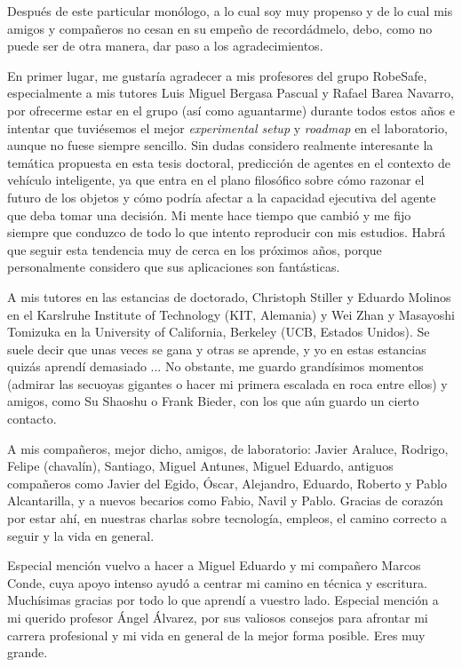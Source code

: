 Después de este particular monólogo, a lo cual soy muy propenso y de lo cual mis amigos y compañeros no cesan en su empeño de recordádmelo, debo, como no puede ser de otra manera, dar paso a los agradecimientos.

En primer lugar, me gustaría agradecer a mis profesores del grupo RobeSafe, especialmente a mis tutores Luis Miguel Bergasa Pascual y Rafael Barea Navarro, por ofrecerme estar en el grupo (así como aguantarme) durante todos estos años e intentar que tuviésemos el mejor \textit{experimental setup} y \textit{roadmap} en el laboratorio, aunque no fuese siempre sencillo. Sin dudas considero realmente interesante la temática propuesta en esta tesis doctoral, predicción de agentes en el contexto de vehículo inteligente, ya que entra en el plano filosófico sobre cómo razonar el futuro de los objetos y cómo podría afectar a la capacidad ejecutiva del agente que deba tomar una decisión. Mi mente hace tiempo que cambió y me fijo siempre que conduzco de todo lo que intento reproducir con mis estudios. Habrá que seguir esta tendencia muy de cerca en los próximos años, porque personalmente considero que sus aplicaciones son fantásticas.

A mis tutores en las estancias de doctorado, Christoph Stiller y Eduardo Molinos en el Karslruhe Institute of Technology (KIT, Alemania) y Wei Zhan y Masayoshi Tomizuka en la University of California, Berkeley (UCB, Estados Unidos). Se suele decir que unas veces se gana y otras se aprende, y yo en estas estancias quizás aprendí demasiado ... No obstante, me guardo grandísimos momentos (admirar las secuoyas gigantes o hacer mi primera escalada en roca entre ellos) y amigos, como Su Shaoshu o Frank Bieder, con los que aún guardo un cierto contacto. 

A mis compañeros, mejor dicho, amigos, de laboratorio: Javier Araluce, Rodrigo, Felipe (chavalín), Santiago, Miguel Antunes, Miguel Eduardo,
antiguos compañeros como Javier del Egido, Óscar, Alejandro, Eduardo, Roberto y Pablo Alcantarilla, y a nuevos becarios como Fabio, Navil y Pablo. Gracias de corazón por estar ahí, en nuestras charlas sobre tecnología, empleos, el camino correcto a seguir y la vida en general.

Especial mención vuelvo a hacer a Miguel Eduardo y mi compañero Marcos Conde, cuya apoyo intenso ayudó a centrar mi camino en técnica y escritura. Muchísimas gracias por todo lo que aprendí a vuestro lado. Especial mención a mi querido profesor Ángel Álvarez, por sus valiosos consejos para afrontar mi carrera profesional y mi vida en general de la mejor forma posible. Eres muy grande.

